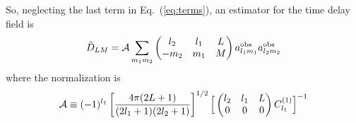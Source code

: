 \documentclass[prd,amsmath,amssymb,floatfix,superscriptaddress,nofootinbib,preprintnumbers]{revtex4-1}
\def\be{\begin{equation}}
\def\ee{\end{equation}}
\newcommand{\ec}[1]{Eq.~(\ref{eq:#1})}
\begin{document}
So, neglecting the last term in \ec{terms}, an estimator for the time delay field is
\be
\hat D_{LM} = \mathcal{A} \sum_{m_1m_2}  \left(\begin{matrix} l_2 & l_1 &L\cr -m_2&m_1&M\end{matrix}\right)
 a^{\rm obs}_{l_1m_1} a^{\rm obs}_{l_2m_2} \ee
 where the normalization is
 \be
 \mathcal{A} \equiv (-1)^{l_1}
 \left[ \frac{4\pi (2L+1)}{(2l_1+1)(2l_2+1)}\right]^{1/2}
 \Big[
 \left(\begin{matrix} l_2& l_1 &L\cr 0&0&0\end{matrix}\right)
 C^{(1)}_{l_1}
 \Big]^{-1}
 \ee
 

\end{document}
